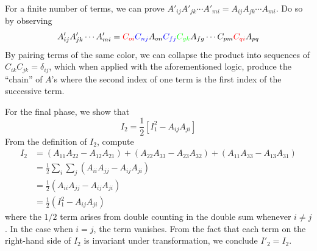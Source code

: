 \documentclass[a4paper]{article}
\begin{document}
For a finite number of terms, we can prove \( A'_{ij}A'_{jk} \cdots A'_{mi} = A_{ij}A_{jk} \cdots A_{mi} \). Do so by observing
\[
	A'_{ij}A'_{jk} \cdots A'_{mi} = \textcolor{red}{C_{oi}}\textcolor{blue}{C_{nj}}A_{on}\textcolor{blue}{C_{fj}}\textcolor{green}{C_{gk}}A_{fg} \cdots C_{pm}\textcolor{red}{C_{qi}}A_{pq}
\]
By pairing terms of the same color, we can collapse the product into sequences of \( C_{ik}C_{jk} = \delta_{ij} \), which when applied with the aforementioned logic, produce the ``chain'' of \( A \)'s where the second index of one term is the first index of the successive term.

For the final phase, we show that 
\[
	I_{2} = \frac{1}{2}\!\left[ I^{2}_{1} - A_{ij}A_{ji} \right] 
\]
From the definition of \( I_{2} \), compute
\begin{align*}
	I_{2} & = \!\left( A_{11}A_{22} - A_{12}A_{21} \right) + \!\left( A_{22}A_{33} - A_{23}A_{32} \right) + \!\left( A_{11}A_{33} - A_{13}A_{31} \right) \\
	 & = \frac{1}{2}\sum_{i}\sum_{j} \!\left( A_{ii}A_{jj} - A_{ij}A_{ji} \right) \\ 
	 & = \frac{1}{2}\!\left( A_{ii}A_{jj} - A_{ij}A_{ji} \right) \\
	 & = \frac{1}{2}\!\left( I^{2}_{1} - A_{ij}A_{ji} \right)
\end{align*}
where the \( 1/2 \) term arises from double counting in the double sum whenever \( i \neq j \). In the case when \( i = j \), the term vanishes. From the fact that each term on the right-hand side of \( I_{2} \) is invariant under transformation, we conclude \( I'_{2} = I_{2} \).
\end{document}

